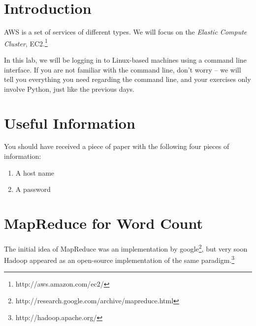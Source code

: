 \section{Introduction}

AWS is a set of services of different types. We will focus on the \emph{Elastic
Compute Cluster}, EC2.\footnote{http://aws.amazon.com/ec2/}

In this lab, we will be logging in to Linux-based machines using a command line
interface. If you are not familiar with the command line, don't worry -- we
will tell you everything you need regarding the command line, and your
exercises only involve Python, just like the previous days.

\section{Useful Information}

You should have received a piece of paper with the following four pieces of
information:

\begin{enumerate}
\item A host name
\item A password
\end{enumerate}

%
%
%
%

\section{MapReduce for Word Count}

The initial idea of MapReduce was an implementation by
google\footnote{http://research.google.com/archive/mapreduce.html}, but very
soon Hadoop appeared as an open-source implementation of the same
paradigm.\footnote{http://hadoop.apache.org/}

